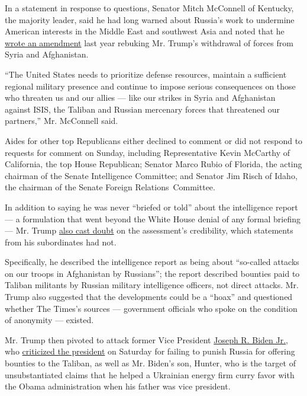 In a statement in response to questions, Senator Mitch McConnell of
Kentucky, the majority leader, said he had long warned about Russia's
work to undermine American interests in the Middle East and southwest
Asia and noted that he
\href{https://www.nytimes.com/2019/01/31/us/politics/senate-vote-syria-afghanistan.html}{wrote
an amendment} last year rebuking Mr. Trump's withdrawal of forces from
Syria and Afghanistan.

``The United States needs to prioritize defense resources, maintain a
sufficient regional military presence and continue to impose serious
consequences on those who threaten us and our allies --- like our
strikes in Syria and Afghanistan against ISIS, the Taliban and Russian
mercenary forces that threatened our partners,'' Mr. McConnell said.

Aides for other top Republicans either declined to comment or did not
respond to requests for comment on Sunday, including Representative
Kevin McCarthy of California, the top House Republican; Senator Marco
Rubio of Florida, the acting chairman of the Senate Intelligence
Committee; and Senator Jim Risch of Idaho, the chairman of the Senate
Foreign Relations~Committee.

In addition to saying he was never ``briefed or told'' about the
intelligence report --- a formulation that went beyond the White House
denial of any formal briefing --- Mr. Trump
\href{https://mobile.twitter.com/realDonaldTrump/status/1277202159109537793}{also
cast doubt} on the assessment's credibility, which statements from his
subordinates had not.

Specifically, he described the intelligence report as being about
``so-called attacks on our troops in Afghanistan by Russians''; the
report described bounties paid to Taliban militants by Russian military
intelligence officers, not direct attacks. Mr. Trump also suggested that
the developments could be a ``hoax'' and questioned whether The Times's
sources --- government officials who spoke on the condition of anonymity
--- existed.

Mr. Trump then pivoted to attack former Vice President
\href{https://www.nytimes.com/interactive/2020/us/elections/joe-biden.html}{Joseph
R. Biden Jr.}, who
\href{https://www.nytimes.com/2020/06/27/us/politics/trump-russia-bounties-afghanistan.html}{criticized
the president} on Saturday for failing to punish Russia for offering
bounties to the Taliban, as well as Mr. Biden's son, Hunter, who is the
target of unsubstantiated claims that he helped a Ukrainian energy firm
curry favor with the Obama administration when his father was vice
president.

